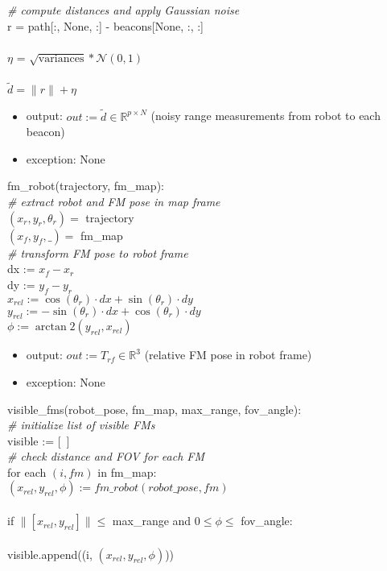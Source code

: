 \documentclass[12pt, titlepage]{article}
\begin{document}
\noindent \textit{\# compute distances and apply Gaussian noise} \\
r = path[:, None, :] - beacons[None, :, :] \\\\
$\eta$ = $\sqrt{\mathrm{variances}} * \mathcal{N}(0, 1)$ \\\\
$\tilde{d} = \|r\| + \eta$ 

\begin{itemize}
  \item output: $out := \tilde{d} \in \mathbb{R}^{p \times N}$ (noisy range measurements from robot to each beacon)
  \item exception: None
\end{itemize}

\noindent fm\_robot(trajectory, fm\_map): \\

\noindent \textit{\# extract robot and FM pose in map frame} \\
$(x_r, y_r, \theta_r) =$ trajectory \\
$(x_f, y_f, \_) =$ fm\_map \\

\noindent \textit{\# transform FM pose to robot frame} \\
dx := $x_f - x_r$ \\
 dy := $y_f - y_r$ \\
$x_{rel} := \cos(\theta_r) \cdot dx + \sin(\theta_r) \cdot dy$ \\
$y_{rel} := -\sin(\theta_r) \cdot dx + \cos(\theta_r) \cdot dy$ \\
$\phi := \arctan2(y_{rel}, x_{rel})$ 

\begin{itemize}
  \item output: $out := T_{rf} \in \mathbb{R}^3$ (relative FM pose in robot frame)
  \item exception: None
\end{itemize}


\noindent visible\_fms(robot\_pose, fm\_map, max\_range, fov\_angle): \\

\noindent \textit{\# initialize list of visible FMs} \\
visible := [~] \\

\noindent \textit{\# check distance and FOV for each FM} \\
for each $(i, fm)$ in fm\_map: \\
\hspace*{1em} $(x_{rel}, y_{rel}, \phi) := fm\_robot(robot\_pose, fm)$ \\\\
\hspace*{1em} if $\|[x_{rel}, y_{rel}]\| \leq$ max\_range and $0 \leq \phi \leq$ fov\_angle: \\\\
\hspace*{2em} visible.append((i, $(x_{rel}, y_{rel}, \phi)$)) 
\end{document}
